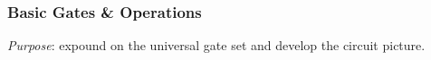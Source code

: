 





%
%
%
%
%
%

\subsubsection{Basic Gates \& Operations}

\emph{Purpose}: expound on the universal gate set and develop the circuit picture.

